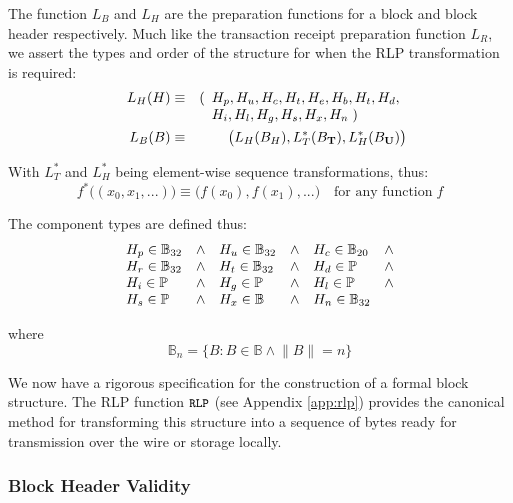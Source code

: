 \documentclass[9pt,oneside]{amsart}
\begin{document}
\begin{multicols}{2}
The function $L_B$ and $L_H$ are the preparation functions for a block and block header respectively. Much like the transaction receipt preparation function $L_R$, we assert the types and order of the structure for when the RLP transformation is required:
\begin{eqnarray}
\quad L_H(H) & \equiv & (\begin{array}[t]{l}H_p, H_u, H_c, H_t, H_e, H_b, H_t, H_d,\\ H_i, H_l, H_g, H_s, H_x, H_n \; )\end{array} \\
\quad L_B(B) & \equiv & \big( L_H(B_H), L_T^*(B_\mathbf{T}), L_H^*(B_\mathbf{U}) \big)
\end{eqnarray}

With $L_T^*$ and $L_H^*$ being element-wise sequence transformations, thus:
\begin{equation}
f^*\big( (x_0, x_1, ...) \big) \equiv \big( f(x_0), f(x_1), ... \big) \quad \text{for any function} \; f
\end{equation}

The component types are defined thus:
\begin{equation}
\begin{array}[t]{lclclcl}
H_p \in \mathbb{B}_{32} & \wedge & H_u \in \mathbb{B}_{32} & \wedge & H_c \in \mathbb{B}_{20} & \wedge \\
H_r \in \mathbb{B}_{32} & \wedge & H_t \in \mathbb{B}_{32} & \wedge & H_d \in \mathbb{P} & \wedge \\
H_i \in \mathbb{P} & \wedge & H_g \in \mathbb{P} & \wedge & H_l \in \mathbb{P} & \wedge \\
H_s \in \mathbb{P} & \wedge & H_x \in \mathbb{B} & \wedge & H_n \in \mathbb{B}_{32}
\end{array}
\end{equation}

where
\begin{equation}
\mathbb{B}_n = \{ B: B \in \mathbb{B} \wedge \lVert B \rVert = n \}
\end{equation}

We now have a rigorous specification for the construction of a formal block structure. The RLP function $\texttt{\small RLP}$ (see Appendix \ref{app:rlp}) provides the canonical method for transforming this structure into a sequence of bytes ready for transmission over the wire or storage locally.

\subsubsection{Block Header Validity}


\end{multicols}
\end{document}
